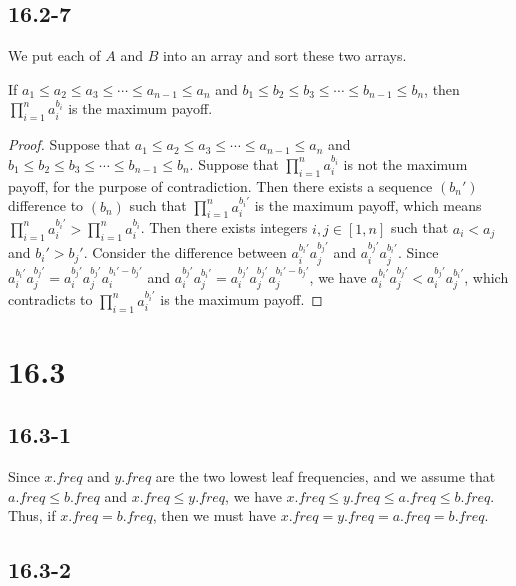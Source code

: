 \subsection*{16.2-7}

We put each of $A$ and $B$ into an array and sort these two arrays.

\begin{claim}
    If $a_1 \leq a_2 \leq a_3 \leq \cdots \leq a_{n-1} \leq a_n$
    and $b_1 \leq b_2 \leq b_3 \leq \cdots \leq b_{n-1} \leq b_n$,
    then $\prod\limits_{i = 1}^n a_i^{b_i}$ is the maximum payoff. 
\end{claim}

\begin{proof}
    Suppose that $a_1 \leq a_2 \leq a_3 \leq \cdots \leq a_{n-1} \leq a_n$
    and $b_1 \leq b_2 \leq b_3 \leq \cdots \leq b_{n-1} \leq b_n$.
    Suppose that $\prod\limits_{i = 1}^n a_i^{b_i}$ is not the maximum payoff, 
    for the purpose of contradiction.
    Then there exists a sequence $(b_n')$ difference to $(b_n)$ such that
    $\prod\limits_{i = 1}^n a_i^{b_i'}$ is the maximum payoff,
    which means $\prod\limits_{i = 1}^n a_i^{b_i'} > \prod\limits_{i = 1}^n a_i^{b_i}$.
    Then there exists integers $i, j \in [1, n]$ such that $a_i < a_j$ and $b_i' > b_j'$.
    Consider the difference between $a_i^{b_i'}a_j^{b_j'}$ and $a_i^{b_j'}a_j^{b_i'}$.
    Since $a_i^{b_i'}a_j^{b_j'} = a_i^{b_j'}a_j^{b_j'}a_i^{b_i' - b_j'}$
    and $a_i^{b_j'}a_j^{b_i'} = a_i^{b_j'}a_j^{b_j'}a_j^{b_i' - b_j'}$,
    we have $a_i^{b_i'}a_j^{b_j'} < a_i^{b_j'}a_j^{b_i'}$,
    which contradicts to $\prod\limits_{i = 1}^n a_i^{b_i'}$ is the maximum payoff.
\end{proof}

\section*{16.3}

\subsection*{16.3-1}

Since $x.freq$ and $y.freq$ are the two lowest leaf frequencies,
and we assume that $a.freq \leq b.freq$ and $x.freq \leq y.freq$,
we have $x.freq \leq y.freq \leq a.freq \leq b.freq$.
Thus, if $x.freq = b.freq$, then we must have 
$x.freq = y.freq = a.freq = b.freq$.

\subsection*{16.3-2}

